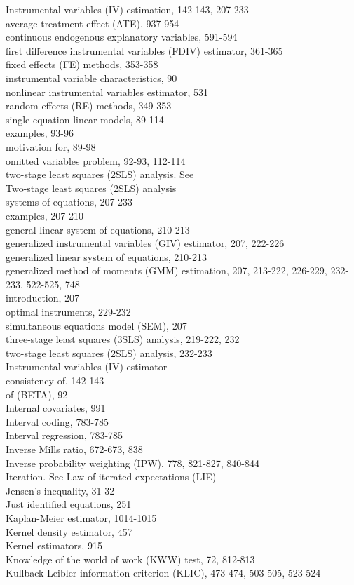 \documentclass[10pt]{article}
\begin{document}
Instrumental variables (IV) estimation, 142-143, 207-233\\
average treatment effect (ATE), 937-954\\
continuous endogenous explanatory variables, 591-594\\
first difference instrumental variables (FDIV) estimator, 361-365\\
fixed effects (FE) methods, 353-358\\
instrumental variable characteristics, 90\\
nonlinear instrumental variables estimator, 531\\
random effects (RE) methods, 349-353\\
single-equation linear models, 89-114\\
examples, 93-96\\
motivation for, 89-98\\
omitted variables problem, 92-93, 112-114\\
two-stage least squares (2SLS) analysis. See\\
Two-stage least squares (2SLS) analysis\\
systems of equations, 207-233\\
examples, 207-210\\
general linear system of equations, 210-213\\
generalized instrumental variables (GIV) estimator, 207, 222-226\\
generalized linear system of equations, 210-213\\
generalized method of moments (GMM) estimation, 207, 213-222, 226-229, 232-233, 522-525, 748\\
introduction, 207\\
optimal instruments, 229-232\\
simultaneous equations model (SEM), 207\\
three-stage least squares (3SLS) analysis, 219-222, 232\\
two-stage least squares (2SLS) analysis, 232-233\\
Instrumental variables (IV) estimator\\
consistency of, 142-143\\
of (BETA), 92\\
Internal covariates, 991\\
Interval coding, 783-785\\
Interval regression, 783-785\\
Inverse Mills ratio, 672-673, 838\\
Inverse probability weighting (IPW), 778, 821-827, 840-844\\
Iteration. See Law of iterated expectations (LIE)\\
Jensen's inequality, 31-32\\
Just identified equations, 251\\
Kaplan-Meier estimator, 1014-1015\\
Kernel density estimator, 457\\
Kernel estimators, 915\\
Knowledge of the world of work (KWW) test, 72, 812-813\\
Kullback-Leibler information criterion (KLIC), 473-474, 503-505, 523-524
\end{document}
